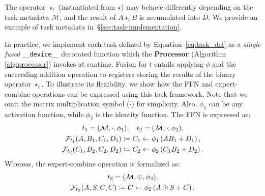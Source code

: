 The operator $\star_t$ (instantiated from $\star$) may behave differently depending on the task metadata $\mathcal{M}$, and the result of $A \star_t B$ is accumulated into $D$. We provide an example of task metadata in~\S\ref{sec:task-implementation}.

In practice, we implement each task defined by Equation~\ref{eq:task_def} as a \emph{single fused} \verb|__device__|
decorated function which the \textbf{Processor} (Algorithm \ref{alg:processor}) invokes at runtime.
Fusion for $t$ entails applying $\phi$ and the succeeding addition operation to registers
storing the results of the binary operator $\star_t$.
To illustrate its flexibility, we show how the FFN and expert-combine operations can be expressed
using this task framework.
Note that we omit the matrix multiplication symbol ($\cdot$) for simplicity.
Also, $\phi_1$ can be any activation function, while $\phi_2$ is the identity function.
The FFN is expressed as:
\begin{gather*}\small
    t_1 = (\mathcal{M}, \cdot, \phi_1), \quad t_2 = (\mathcal{M}, \cdot, \phi_2), \\ \small
    \mathcal{F}_{t_1}(A, B_1, C_1, D_1) \coloneqq C_1 \gets \phi_1\left(A B_1 + D_1\right), \\ \small
    \mathcal{F}_{t_2}(C_1, B_2, C_2, D_2) \coloneqq C_2 \gets \phi_2\left(C_1 B_2 + D_2\right).
\end{gather*}
Whereas, the expert-combine operation is formalized as:
\begin{gather*}\small
    t_3 = (\mathcal{M}, \odot, \phi_2), \\ \small
    \mathcal{F}_{t_3}(A, S, C, C) \coloneqq C \gets \phi_2\left(A \odot S + C\right).
\end{gather*}
